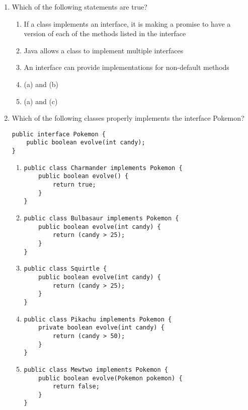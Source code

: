 \documentclass[CS180-S16-FinalExam.tex]{subfiles}
\begin{document}
\begin{enumerate}
\item Which of the following statements are true?
\begin{enumerate}
\item  If a class implements an interface, it is making a promise to have a version of each of the methods listed in the interface
\item Java allows a class to implement multiple interfaces
\item An interface can provide implementations for non-default methods
\item (a) and (b)  \ifdraft \Ans \fi
\item (a) and (c)
\end{enumerate}

\item  Which of the following classes properly implements the interface Pokemon?
\begin{lstlisting}
public interface Pokemon {
	public boolean evolve(int candy);
}
\end{lstlisting}

\begin{enumerate}
\item \begin{lstlisting}
public class Charmander implements Pokemon { 
	public boolean evolve() {
		return true;
    }
}
\end{lstlisting}

\item  \ifdraft \Ans \fi \begin{lstlisting}
public class Bulbasaur implements Pokemon {
	public boolean evolve(int candy) {
		return (candy > 25);
	}
}
\end{lstlisting}

\item \begin{lstlisting}
public class Squirtle {
	public boolean evolve(int candy) {
		return (candy > 25);
	}
}
\end{lstlisting}

\item \begin{lstlisting}
public class Pikachu implements Pokemon { 
	private boolean evolve(int candy) {
		return (candy > 50);
	}
}
\end{lstlisting}

\item
\begin{lstlisting}
public class Mewtwo implements Pokemon {
	public boolean evolve(Pokemon pokemon) {
		return false;
    }
} 
\end{lstlisting}
\end{enumerate}


\end{enumerate}
\end{document}
